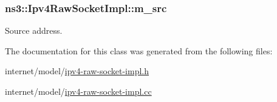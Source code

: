 \subsubsection[{\texorpdfstring{m\+\_\+src}{m_src}}]{ ns3\+::\+Ipv4\+Raw\+Socket\+Impl\+::m\+\_\+src\hspace{0.3cm}{\ttfamily [private]}}\hypertarget{classns3_1_1Ipv4RawSocketImpl_a1881de88180f919a385b14db64b93932}{}\label{classns3_1_1Ipv4RawSocketImpl_a1881de88180f919a385b14db64b93932}


Source address. 



The documentation for this class was generated from the following files\+:\begin{DoxyCompactItemize}
\item 
internet/model/\hyperlink{ipv4-raw-socket-impl_8h}{ipv4-\/raw-\/socket-\/impl.\+h}\item 
internet/model/\hyperlink{ipv4-raw-socket-impl_8cc}{ipv4-\/raw-\/socket-\/impl.\+cc}\end{DoxyCompactItemize}

